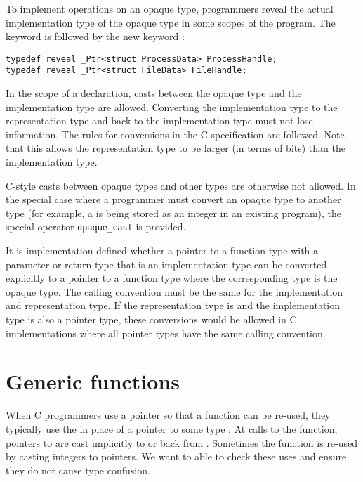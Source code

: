 To implement operations on an opaque type,
programmers reveal the actual implementation type of the opaque type
in some scopes of the program.  The
keyword  is followed by the new keyword :
\begin{lstlisting}
typedef reveal _Ptr<struct ProcessData> ProcessHandle;
typedef reveal _Ptr<struct FileData> FileHandle;
\end{lstlisting}
In the scope of a  declaration, casts between the
opaque type and the implementation type are allowed.  
Converting the implementation type to the representation
type and back to the implementation type must not lose information.  
The rules for conversions in the C specification are followed.   Note that 
this allows the representation type to be larger (in terms of bits) than the implementation type.

C-style casts between opaque types and other types are otherwise not allowed.
In the special case where a programmer must convert an opaque type to another
type (for example, a \uncheckedptrvoid{} is being stored as an integer in an existing
program), the special operator \lstinline|opaque_cast| is provided.

It is implementation-defined whether a pointer to a function type with a
parameter or return type that is an implementation type can be converted
explicitly to a pointer to a function type where the corresponding type
is the opaque type.   The calling convention must be the same for
the implementation and representation type.  If the representation type is \uncheckedptrvoid{}
and the implementation type is also a pointer type,  these conversions would be
allowed in C implementations where all pointer types have the same calling convention.

\section{Generic functions}
\label{sec:generic-functions}

When C programmers use a \uncheckedptrvoid{} pointer so that a function
can be re-used, they typically use the \uncheckedptrvoid{} in place of a pointer 
to some type .  At calls to the function, pointers to  are cast
implicitly to \uncheckedptrvoid{} or back from \uncheckedptrvoid{}.  
Sometimes the function is re-used by casting integers to \uncheckedptrvoid{} pointers.
We want to able to check these uses and ensure they do not cause type confusion.

